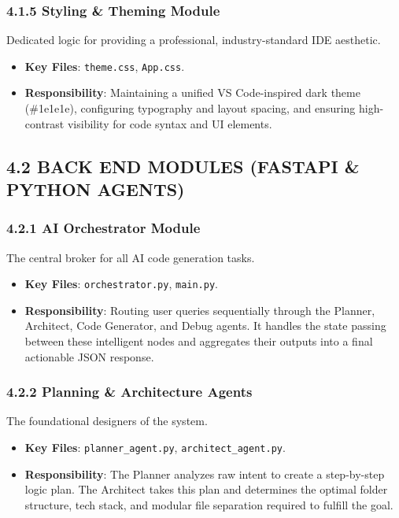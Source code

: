 \documentclass[
  12pt,
]{article}
\providecommand{\tightlist}{%
  \setlength{\itemsep}{0pt}\setlength{\parskip}{0pt}}
\begin{document}
\subsubsection{4.1.5 Styling \& Theming
Module}\label{styling-theming-module}

Dedicated logic for providing a professional, industry-standard IDE
aesthetic.

\begin{itemize}
\tightlist
\item
  \textbf{Key Files}: \texttt{theme.css}, \texttt{App.css}.
\item
  \textbf{Responsibility}: Maintaining a unified VS Code-inspired dark
  theme (\#1e1e1e), configuring typography and layout spacing, and
  ensuring high-contrast visibility for code syntax and UI elements.
\end{itemize}

\subsection{4.2 BACK END MODULES (FASTAPI \& PYTHON
AGENTS)}\label{back-end-modules-fastapi-python-agents}

\subsubsection{4.2.1 AI Orchestrator
Module}\label{ai-orchestrator-module}

The central broker for all AI code generation tasks.

\begin{itemize}
\tightlist
\item
  \textbf{Key Files}: \texttt{orchestrator.py}, \texttt{main.py}.
\item
  \textbf{Responsibility}: Routing user queries sequentially through the
  Planner, Architect, Code Generator, and Debug agents. It handles the
  state passing between these intelligent nodes and aggregates their
  outputs into a final actionable JSON response.
\end{itemize}

\subsubsection{4.2.2 Planning \& Architecture
Agents}\label{planning-architecture-agents}

The foundational designers of the system.

\begin{itemize}
\tightlist
\item
  \textbf{Key Files}: \texttt{planner\_agent.py},
  \texttt{architect\_agent.py}.
\item
  \textbf{Responsibility}: The Planner analyzes raw intent to create a
  step-by-step logic plan. The Architect takes this plan and determines
  the optimal folder structure, tech stack, and modular file separation
  required to fulfill the goal.
\end{itemize}
\end{document}

